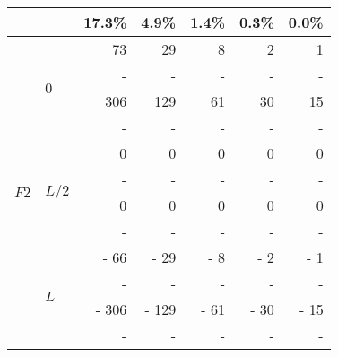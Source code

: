 {{{\begin{tabularx}{0.6\textwidth}{@{} XX rrrrr@{}}
					&&{\color{black}\scriptsize17.3\%}&{\color{black}\scriptsize4.9\%}&{\color{black}\scriptsize1.4\%}&{\color{black}\scriptsize0.3\%}&{\color{black}\scriptsize0.0\%}\\\midrule
					\multirow{12}{*}{$F2$}&\multirow{4}{*}{$0$}&{\color{Tblue}\normalsize 73}&{\color{Tblue}\normalsize 29}&{\color{Tblue}\normalsize 8}&{\color{Tblue}\normalsize 2}&{\color{Tblue}\normalsize 1}\\
					&&{\color{Tblue}\scriptsize-}&{\color{Tblue}\scriptsize-}&{\color{Tblue}\scriptsize-}&{\color{Tblue}\scriptsize-}&{\color{Tblue}\scriptsize-}\\
					&&{\color{black}\normalsize 306}&{\color{black}\normalsize 129}&{\color{black}\normalsize 61}&{\color{black}\normalsize 30}&{\color{black}\normalsize 15}\\
					&&{\color{black}\scriptsize-}&{\color{black}\scriptsize-}&{\color{black}\scriptsize-}&{\color{black}\scriptsize-}&{\color{black}\scriptsize-}\\\cmidrule[0.5\cmidrulewidth]{2-7}
					&\multirow{4}{*}{$L/2$}&{\color{Tblue}\normalsize 0}&{\color{Tblue}\normalsize 0}&{\color{Tblue}\normalsize 0}&{\color{Tblue}\normalsize 0}&{\color{Tblue}\normalsize 0}\\
					&&{\color{Tblue}\scriptsize-}&{\color{Tblue}\scriptsize-}&{\color{Tblue}\scriptsize-}&{\color{Tblue}\scriptsize-}&{\color{Tblue}\scriptsize-}\\
					&&{\color{black}\normalsize 0}&{\color{black}\normalsize 0}&{\color{black}\normalsize 0}&{\color{black}\normalsize 0}&{\color{black}\normalsize 0}\\
					&&{\color{black}\scriptsize-}&{\color{black}\scriptsize-}&{\color{black}\scriptsize-}&{\color{black}\scriptsize-}&{\color{black}\scriptsize-}\\\cmidrule[0.5\cmidrulewidth]{2-7}
					&\multirow{4}{*}{$L$}&{\color{Tblue}\normalsize- 66}&{\color{Tblue}\normalsize- 29}&{\color{Tblue}\normalsize- 8}&{\color{Tblue}\normalsize- 2}&{\color{Tblue}\normalsize- 1}\\
					&&{\color{Tblue}\scriptsize-}&{\color{Tblue}\scriptsize-}&{\color{Tblue}\scriptsize-}&{\color{Tblue}\scriptsize-}&{\color{Tblue}\scriptsize-}\\
					&&{\color{black}\normalsize- 306}&{\color{black}\normalsize- 129}&{\color{black}\normalsize- 61}&{\color{black}\normalsize- 30}&{\color{black}\normalsize- 15}\\
					&&{\color{black}\scriptsize-}&{\color{black}\scriptsize-}&{\color{black}\scriptsize-}&{\color{black}\scriptsize-}&{\color{black}\scriptsize-}\\

\end{tabularx}}}}
